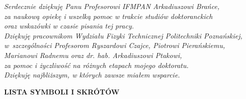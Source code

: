 \documentclass[12pt,a4paper,openright]{report} %
\begin{document}
\clearpage\thispagestyle{empty}
\noindent
\vspace{15cm}
\begin{flushright}
\textit{Serdecznie dziękuję Panu Profesorowi IFMPAN Arkadiuszowi Brańce,\\
za naukową opiekę i wszelką pomoc w trakcie studiów doktoranckich \\
oraz wskazówki w czasie pisania tej pracy.\\
\vspace{1cm}
Dziękuję pracownikom Wydziału Fizyki Technicznej Politechniki Poznańskiej,
w~szczególności Profesorom Ryszardowi Czajce, Piotrowi Pierańskiemu, \\ Marianowi Radnemu 
oraz dr. hab. Arkadiuszowi Ptakowi, \\za pomoc i życzliwość na różnych etapach mojego doktoratu.\\
\vspace{1cm}
Dziękuję najbliższym, w których zawsze miałem wsparcie.}
\end{flushright}
%
%
\clearpage\thispagestyle{empty}
\textbf{LISTA SYMBOLI I SKRÓTÓW}\\
\end{document}
